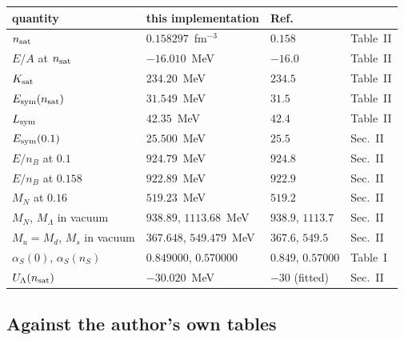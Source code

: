 \documentclass[aps,prc,onecolumn,superscriptaddress,nofootinbib,10pt]{revtex4-2}
\newcommand{\nB}{n_B}
\begin{document}
\begin{center}
\begin{tabular}{llll}
\toprule
quantity & this implementation & Ref.~\cite{Xia2024} & \\
\midrule
$n_{\rm sat}$              & $0.158297$~fm$^{-3}$ & $0.158$ & Table~II \\
$E/A$ at $n_{\rm sat}$     & $-16.010$~MeV        & $-16.0$ & Table~II \\
$K_{\rm sat}$              & $234.20$~MeV         & $234.5$ & Table~II \\
$E_{\rm sym}(n_{\rm sat})$ & $31.549$~MeV         & $31.5$  & Table~II \\
$L_{\rm sym}$              & $42.35$~MeV          & $42.4$  & Table~II \\
$E_{\rm sym}(0.1)$         & $25.500$~MeV         & $25.5$  & Sec.~II \\
$E/\nB$ at $0.1$           & $924.79$~MeV         & $924.8$ & Sec.~II \\
$E/\nB$ at $0.158$         & $922.89$~MeV         & $922.9$ & Sec.~II \\
$M_N$ at $0.16$            & $519.23$~MeV         & $519.2$ & Sec.~II \\
$M_N$, $M_\Lambda$ in vacuum & $938.89$, $1113.68$~MeV & $938.9$, $1113.7$ & Sec.~II \\
$M_u = M_d$, $M_s$ in vacuum & $367.648$, $549.479$~MeV & $367.6$, $549.5$ & Sec.~II \\
$\alpha_S(0)$, $\alpha_S(n_S)$ & $0.849000$, $0.570000$ & $0.849$, $0.57000$ & Table~I \\
$U_\Lambda(n_{\rm sat})$   & $-30.020$~MeV        & $-30$ (fitted) & Sec.~II \\
\bottomrule
\end{tabular}
\end{center}

\subsection{Against the author's own tables}
\end{document}
